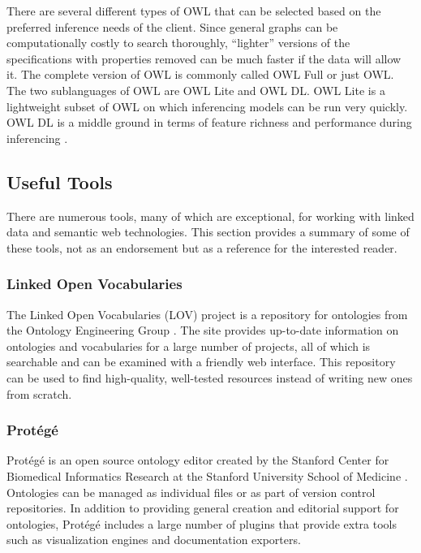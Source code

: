 There are several different types of OWL that can be selected based on the
preferred inference needs of the client. Since general graphs can be
computationally costly to search thoroughly, ``lighter'' versions of the
specifications with properties removed can be much faster if the data will allow
it. The complete version of OWL is commonly called OWL Full or just OWL. The two
sublanguages of OWL are OWL Lite and OWL DL. OWL Lite is a lightweight subset
of OWL on which inferencing models can be run very quickly. OWL DL
is a middle ground in terms of feature richness and performance
during inferencing \cite{owl-syntax}.

\subsection{Useful Tools}

There are numerous tools, many of which are exceptional, for working with linked
data and semantic web technologies. This section provides a summary of some of
these tools, not as an endorsement but as a reference for the interested reader.

\subsubsection{Linked Open Vocabularies}

The Linked Open Vocabularies (LOV) project is a repository for ontologies from
the Ontology Engineering Group \cite{lov}. The site provides up-to-date
information on ontologies and vocabularies for a large number of projects, all
of which is searchable and can be examined with a friendly web interface. This
repository can be used to find high-quality, well-tested resources instead of
writing new ones from scratch.

\subsubsection{Prot\'eg\'e}

Prot\'eg\'e is an open source ontology editor created by the Stanford Center for
Biomedical Informatics Research at the Stanford University School of Medicine
\cite{protege}. Ontologies can be managed as individual files or as part of
version control repositories. In addition to providing general creation and
editorial support for ontologies, Prot\'eg\'e includes a large number of plugins
that provide extra tools such as visualization engines and documentation
exporters.

